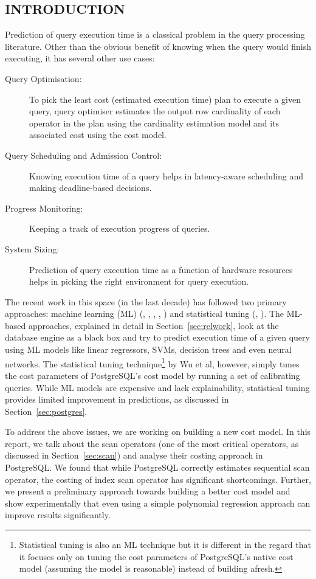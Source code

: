 \documentclass{article}
\begin{document}
	\begin{multicols}{2}
	\section{INTRODUCTION}
	Prediction of query execution time is a classical problem in the query processing literature. Other than the obvious benefit of knowing when the query would finish executing, it has several other use cases:
	\begin{description}
		\item [Query Optimisation:] To pick the least cost (estimated execution time) plan to execute a given query, query optimiser estimates the output row cardinality of each operator in the plan using the cardinality estimation model and its associated cost using the cost model.
		\item [Query Scheduling and Admission Control:] Knowing execution time of a query helps in latency-aware scheduling and making deadline-based decisions. 
		\item [Progress Monitoring:] Keeping a track of execution progress of queries.
		\item [System Sizing:] Prediction of query execution time as a function of hardware resources helps in picking the right environment for query execution.
	\end{description}

	The recent work in this space (in the last decade) has followed two primary approaches: machine learning (ML) (\cite{akdere}, \cite{ganapathi}, \cite{chetan}, \cite{surajit}, \cite{marcus}) and statistical tuning (\cite{wu}, \cite{wu_wu}). The ML-based approaches, explained in detail in Section~\ref{sec:relwork}, look at the database engine as a black box and try to predict execution time of a given query using ML models like linear regressors, SVMs, decision trees and even neural networks. The statistical tuning technique\footnote{Statistical tuning is also an ML technique but it is different in the regard that it focuses only on tuning the cost parameters of PostgreSQL's native cost model (assuming the model is reasonable) instead of building afresh.} by Wu et al\cite{wu}, however, simply tunes the cost parameters of PostgreSQL's cost model by running a set of calibrating queries. While ML models are expensive and lack explainability, statistical tuning provides limited improvement in predictions, as discussed in Section~\ref{sec:postgres}.
	
	To address the above issues, we are working on building a new cost model. In this report, we talk about the scan operators (one of the most critical operators, as discussed in Section~\ref{sec:scan}) and analyse their costing approach in PostgreSQL. We found that while PostgreSQL correctly estimates sequential scan operator, the costing of index scan operator has significant shortcomings. Further, we present a preliminary approach towards building a better cost model and show experimentally that even using a simple polynomial regression approach can improve results significantly.
	

\end{multicols}
\end{document}
